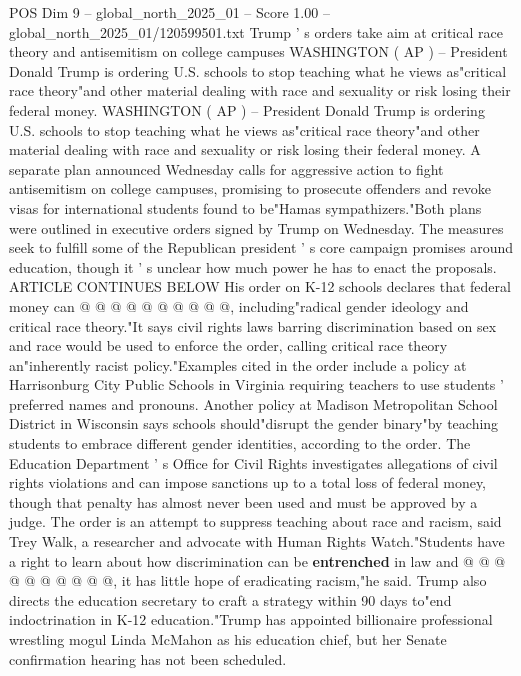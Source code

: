 \begin{textsample}{POS Dim 9 – global\_north\_2025\_01 – Score 1.00 – global\_north\_2025\_01/120599501.txt}  \label{ex:f9_pos_418}
Trump ' s orders take aim at critical race theory and antisemitism on college campuses WASHINGTON ( AP ) -- President Donald Trump is ordering U.S. schools to stop teaching what he views as"critical race theory"and other material dealing with race and sexuality or risk losing their federal money.
WASHINGTON ( AP ) -- President Donald Trump is ordering U.S. schools to stop teaching what he views as"critical race theory"and other material dealing with race and sexuality or risk losing their federal money.
A separate plan announced Wednesday calls for aggressive action to fight antisemitism on college campuses, promising to prosecute offenders and revoke visas for international students found to be"Hamas sympathizers."Both plans were outlined in executive orders signed by Trump on Wednesday.
The measures seek to fulfill some of the Republican president ' s core campaign promises around education, though it ' s unclear how much power he has to enact the proposals.
ARTICLE CONTINUES BELOW His order on K-12 schools declares that federal money can @ @ @ @ @ @ @ @ @ @, including"radical gender ideology and critical race theory."It says civil rights laws barring discrimination based on sex and race would be used to enforce the order, calling critical race theory an"inherently racist policy."Examples cited in the order include a policy at Harrisonburg City Public Schools in Virginia requiring teachers to use students ' preferred names and pronouns.
Another policy at Madison Metropolitan School District in Wisconsin says schools should"disrupt the gender binary"by teaching students to embrace different gender identities, according to the order.
The Education Department ' s Office for Civil Rights investigates allegations of civil rights violations and can impose sanctions up to a total loss of federal money, though that penalty has almost never been used and must be approved by a judge.
The order is an attempt to suppress teaching about race and racism, said Trey Walk, a researcher and advocate with Human Rights Watch."Students have a right to learn about how discrimination can be \textbf{entrenched} in law and @ @ @ @ @ @ @ @ @ @, it has little hope of eradicating racism,"he said.
Trump also directs the education secretary to craft a strategy within 90 days to"end indoctrination in K-12 education."Trump has appointed billionaire professional wrestling mogul Linda McMahon as his education chief, but her Senate confirmation hearing has not been scheduled.

\end{textsample}
